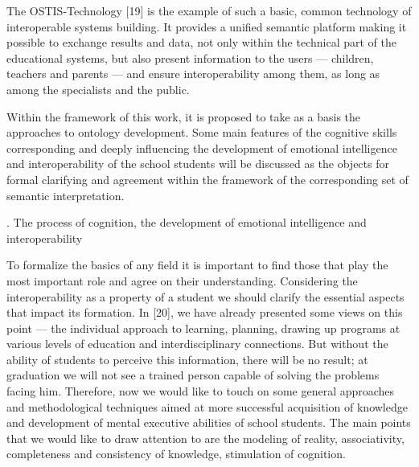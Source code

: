 \documentclass[10pt, a4paper]{article}
\begin{document}
\begin{multicols}{2}
        The OSTIS-Technology [19] is the example of such a basic, common technology of interoperable systems building. It provides a unified semantic platform making it possible to exchange results and data, not only within the technical part of the educational systems, but also present information to the users — children, teachers and parents — and ensure interoperability among them, as long as among the specialists and the public.
        
        Within the framework of this work, it is proposed to take as a basis the approaches to ontology development. Some main features of the cognitive skills corresponding and deeply influencing the development of emotional intelligence and interoperability of the school students will be discussed as the objects for formal clarifying and agreement within the framework of the corresponding set of semantic interpretation.

        \begin{center}
            \MakeUppercase{}. The process of cognition, the development of emotional intelligence and interoperability
        \end{center}
        
        To formalize the basics of any field it is important to find those that play the most important role and agree on their understanding. Considering the interoperability as a property of a student we should clarify the essential aspects that impact its formation. In [20], we have already presented some views on this point — the individual approach to learning, planning, drawing up programs at various levels of education and interdisciplinary connections. But without the ability of students to perceive this information, there will be no result; at graduation we will not see a trained person capable of solving the problems facing him. Therefore, now we would like to touch on some general approaches and methodological techniques aimed at more successful acquisition of knowledge and development of mental executive abilities of school students. The main points that we would like to draw attention to are the modeling of reality, associativity, completeness and consistency of knowledge, stimulation of cognition.


\end{multicols}
\end{document}
